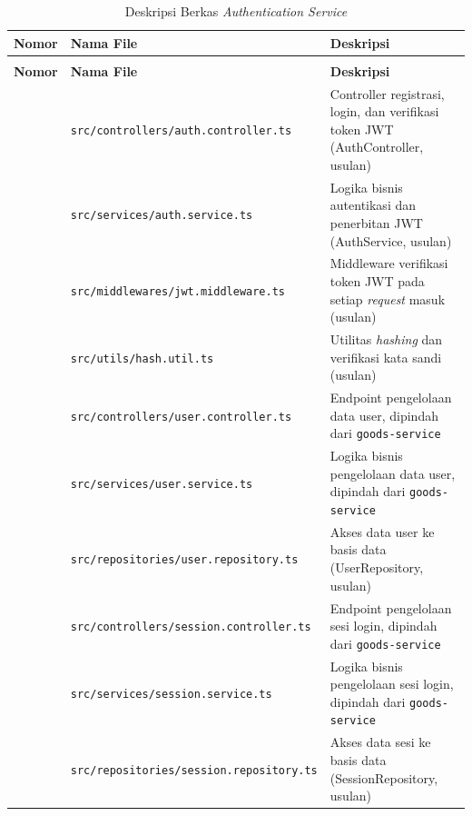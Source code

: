 \begin{xltabular}{\textwidth}{ | >{\raggedright\arraybackslash}p{1.5cm} | >{\raggedright\arraybackslash}p{6.5cm} | >{\raggedright\arraybackslash}X | }
  \caption{Deskripsi Berkas \textit{Authentication Service}} \label{tab:file-auth} \\
  \hline
  \textbf{Nomor} & \textbf{Nama File} & \textbf{Deskripsi} \\
  \hline
  \endfirsthead
   \\
  \hline
  \textbf{Nomor} & \textbf{Nama File} & \textbf{Deskripsi} \\
  \hline
  \endhead
  \hline
   & \texttt{src/\allowbreak controllers/\allowbreak auth.controller.ts} & Controller registrasi, login, dan verifikasi token JWT (AuthController, usulan) \\
     & \texttt{src/\allowbreak services/\allowbreak auth.service.ts} & Logika bisnis autentikasi dan penerbitan JWT (AuthService, usulan) \\
     & \texttt{src/\allowbreak middlewares/\allowbreak jwt.middleware.ts} & Middleware verifikasi token JWT pada setiap \textit{request} masuk (usulan) \\
     & \texttt{src/\allowbreak utils/\allowbreak hash.util.ts} & Utilitas \textit{hashing} dan verifikasi kata sandi (usulan) \\
     & \texttt{src/\allowbreak controllers/\allowbreak user.controller.ts} & Endpoint pengelolaan data user, dipindah dari \texttt{goods-service} \\
     & \texttt{src/\allowbreak services/\allowbreak user.service.ts} & Logika bisnis pengelolaan data user, dipindah dari \texttt{goods-service} \\
     & \texttt{src/\allowbreak repositories/\allowbreak user.repository.ts} & Akses data user ke basis data (UserRepository, usulan) \\
     & \texttt{src/\allowbreak controllers/\allowbreak session.controller.ts} & Endpoint pengelolaan sesi login, dipindah dari \texttt{goods-service} \\
     & \texttt{src/\allowbreak services/\allowbreak session.service.ts} & Logika bisnis pengelolaan sesi login, dipindah dari \texttt{goods-service} \\
     & \texttt{src/\allowbreak repositories/\allowbreak session.repository.ts} & Akses data sesi ke basis data (SessionRepository, usulan) \\
    \hline

\end{xltabular}

